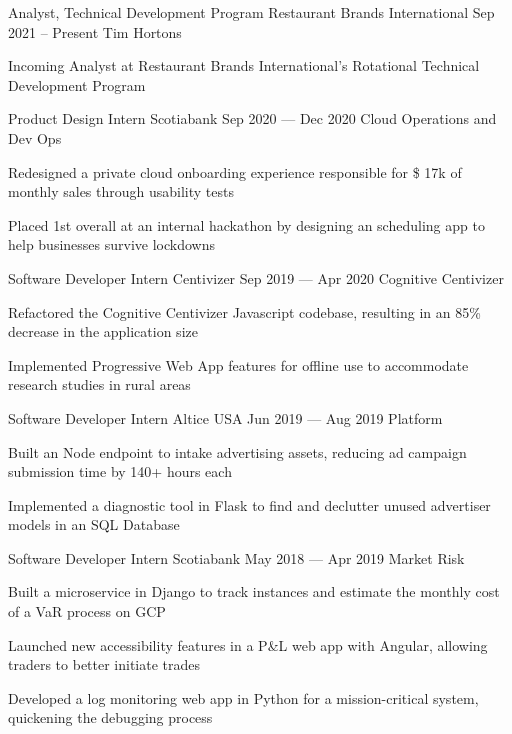 \begin{cventries}
  \cventry
      {Analyst, Technical Development Program}
      {Restaurant Brands International}
      {}
      {Sep 2021 -- Present}
      {Tim Hortons}
      {
        \begin{cvitems}
          \item {Incoming Analyst at Restaurant Brands International's Rotational Technical Development Program}
        \end{cvitems}
      }
  \cventry
    {Product Design Intern}
    {Scotiabank}
    {}
    {Sep 2020 --- Dec 2020}
    {Cloud Operations and Dev Ops}
    {
      \begin{cvitems}
        \item {Redesigned a private cloud onboarding experience responsible for \$ 17k of monthly sales through usability tests}
        \item {Placed 1st overall at an internal hackathon by designing an scheduling app to help businesses survive lockdowns}
      \end{cvitems}
    }
  \cventry
    {Software Developer Intern}
    {Centivizer}
    {}
    {Sep 2019 --- Apr 2020}
    {Cognitive Centivizer}
    {
      \begin{cvitems}
        \item {Refactored the Cognitive Centivizer Javascript codebase, resulting in an 85\% decrease in the application size}
        \item {Implemented Progressive Web App features for offline use to accommodate research studies in rural areas}
      \end{cvitems}
    }

  \cventry
    {Software Developer Intern}
    {Altice USA}
    {}
    {Jun 2019 --- Aug 2019}
    {Platform}
    {
    \begin{cvitems}
      \item {Built an Node endpoint to intake advertising assets, reducing ad campaign submission time by 140+ hours each}
      \item {Implemented a diagnostic tool in Flask to find and declutter unused advertiser models in an SQL Database}
    \end{cvitems}
    }

  \cventry
    {Software Developer Intern}
    {Scotiabank}
    {}
    {May 2018 --- Apr 2019}
    {Market Risk}
    {
      \begin{cvitems}
        \item {Built a microservice in Django to track instances and estimate the monthly cost of a VaR process on GCP}
        \item {Launched new accessibility features in a P\&L web app with Angular, allowing traders to better initiate trades}
        \item {Developed a log monitoring web app in Python for a mission-critical system, quickening the debugging process}
      \end{cvitems}
    }
\end{cventries}
